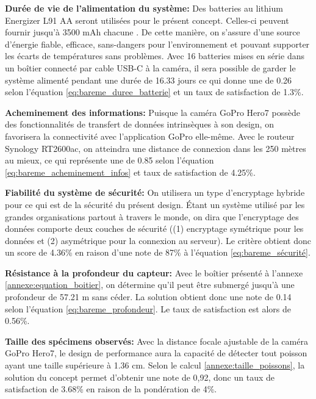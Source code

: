 \textbf{Durée de vie de l’alimentation du système:}
Des batteries au lithium Energizer L91 AA seront utilisées pour le présent concept. Celles-ci peuvent fournir jusqu'à 3500 mAh chacune \cite{Energizer}. De cette manière, on s’assure d’une source d’énergie fiable, efficace, sans-dangers pour l’environnement et pouvant supporter les écarts de températures sans problèmes. Avec 16 batteries mises en série dans un boîtier connecté par cable USB-C à la caméra, il sera possible de garder le système alimenté pendant une durée de 16.33 jours ce qui donne une de 0.26 selon l'équation \ref{eq:bareme_duree_batterie} et un taux de satisfaction de 1.3\%.
\vspace{5mm}

\textbf{Acheminement des informations:}
Puisque la caméra GoPro Hero7 possède des fonctionnalités de transfert de données intrinsèques à son design, on favorisera la connectivité avec l’application GoPro elle-même. Avec le routeur Synology RT2600ac, on atteindra une distance de connexion dans les 250 mètres au mieux, ce qui représente une de 0.85 selon l'équation \ref{eq:bareme_acheminement_infos} et taux de satisfaction de 4.25\%.
\vspace{5mm}

\textbf{Fiabilité du système de sécurité:}
On utilisera un type d’encryptage hybride pour ce qui est de la sécurité du présent design. Étant un système utilisé par les grandes organisations partout à travers le monde, on dira que l’encryptage des données comporte deux couches de sécurité ((1) encryptage symétrique pour les données et (2) asymétrique pour la connexion au serveur). Le critère obtient donc un score de 4.36\% en raison d'une note de 87\% à l'équation \ref{eq:bareme_sécurité}.
\vspace{5mm}


\textbf{Résistance à la profondeur du capteur:} Avec le boîtier présenté à l'annexe \ref{annexe:equation_boitier}, on détermine qu'il peut être submergé jusqu'à une profondeur de 57.21 m sans céder. La solution obtient donc une note de 0.14 selon l'équation \ref{eq:bareme_profondeur}. Le taux de satisfaction est alors de 0.56\%.
\vspace{5mm}

\textbf{Taille des spécimens observés:} Avec la distance focale ajustable de la caméra GoPro Hero7, le design de performance aura la capacité de détecter tout poisson ayant une taille supérieure à 1.36 cm. Selon le calcul 
\ref{annexe:taille_poissons}, la solution du concept permet d'obtenir une note de 0,92, donc un taux de satisfaction de 3.68\% en raison de la pondération de 4\%.
\vspace{5mm}

